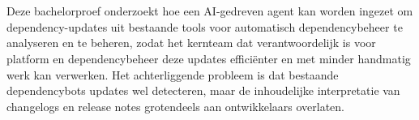 
%
%
%
%
%

%



\chapter*{}

% 


Deze bachelorproef onderzoekt hoe een AI-gedreven agent kan worden ingezet om dependency-updates uit bestaande tools voor automatisch dependencybeheer te analyseren en te beheren, zodat het kernteam dat verantwoordelijk is voor platform en dependencybeheer deze updates efficiënter en met minder handmatig werk kan verwerken. Het achterliggende probleem is dat bestaande dependencybots updates wel detecteren, maar de inhoudelijke interpretatie van changelogs en release notes grotendeels aan ontwikkelaars overlaten.

